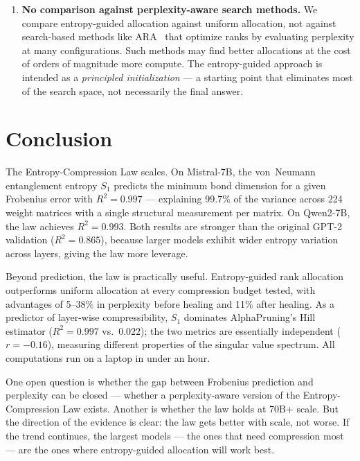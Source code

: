 \documentclass[11pt,a4paper]{article}
\newcommand{\Svn}{S_1}
\begin{document}
\begin{enumerate}[leftmargin=2em, itemsep=3pt]
  \item \textbf{No comparison against perplexity-aware search methods.}
    We compare entropy-guided allocation against uniform allocation,
    not against search-based methods like ARA~\citep{Sun2025ara} that
    optimize ranks by evaluating perplexity at many configurations.
    Such methods may find better allocations at the cost of orders of
    magnitude more compute.  The entropy-guided approach is intended
    as a \emph{principled initialization} --- a starting point that
    eliminates most of the search space, not necessarily the final
    answer.
\end{enumerate}


\section{Conclusion}
\label{sec:conclusion}

The Entropy-Compression Law scales.  On Mistral-7B, the von~Neumann
entanglement entropy $\Svn$ predicts the minimum bond dimension for
a given Frobenius error with $R^2 = 0.997$ --- explaining 99.7\% of
the variance across 224 weight matrices with a single structural
measurement per matrix.  On Qwen2-7B, the law achieves $R^2 = 0.993$.
Both results are stronger than the original GPT-2 validation
($R^2 = 0.865$), because larger models exhibit wider entropy
variation across layers, giving the law more leverage.

Beyond prediction, the law is practically useful.  Entropy-guided
rank allocation outperforms uniform allocation at every compression
budget tested, with advantages of 5--38\% in perplexity before
healing and 11\% after healing.  As a predictor of layer-wise
compressibility, $\Svn$ dominates AlphaPruning's Hill estimator
($R^2 = 0.997$ vs.\ $0.022$); the two metrics are essentially
independent ($r = -0.16$), measuring different properties of the
singular value spectrum.  All computations run on a laptop in under
an hour.

One open question is whether the gap between Frobenius prediction and
perplexity can be closed --- whether a perplexity-aware version of
the Entropy-Compression Law exists.  Another is whether the law
holds at 70B+ scale.  But the direction of the evidence is clear:
the law gets better with scale, not worse.  If the trend continues,
the largest models --- the ones that need compression most --- are
the ones where entropy-guided allocation will work best.
\end{document}
